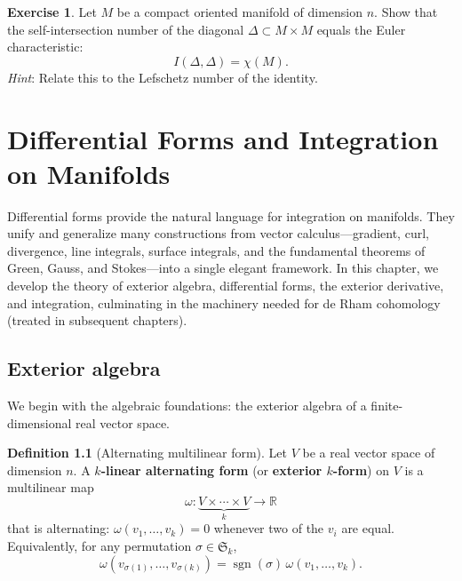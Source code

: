 \documentclass[12pt,a4paper,openany]{book}
\theoremstyle{definition}
\newtheorem{definition}[theorem]{Definition}
\newtheorem{exercise}{Exercise}[chapter]
\theoremstyle{remark}
\newcommand{\R}{\mathbb{R}}
\begin{document}
\begin{exercise}\label{exo:euler-selfintersection-diagonal}
Let $M$ be a compact oriented manifold of dimension $n$. Show that the
self-intersection number of the diagonal $\Delta \subset M \times M$ equals
the Euler characteristic:
\[
  I(\Delta, \Delta) = \chi(M).
\]
\textit{Hint}: Relate this to the Lefschetz number of the identity.
\end{exercise}



\chapter{Differential Forms and Integration on Manifolds}
\label{ch:differential-forms}
\minitoc\vspace{1cm}

Differential forms provide the natural language for integration on manifolds.
They unify and generalize many constructions from vector calculus---gradient,
curl, divergence, line integrals, surface integrals, and the fundamental
theorems of Green, Gauss, and Stokes---into a single elegant framework.
In this chapter, we develop the theory of exterior algebra, differential forms,
the exterior derivative, and integration, culminating in the machinery needed
for de Rham cohomology (treated in subsequent chapters).

\section{Exterior algebra}\label{sec:exterior-algebra}

We begin with the algebraic foundations: the exterior algebra of a
finite-dimensional real vector space.

\begin{definition}[Alternating multilinear form]\label{def:alternating-form}
Let $V$ be a real vector space of dimension $n$. A \textbf{$k$-linear
alternating form} (or \textbf{exterior $k$-form}) on $V$ is a multilinear
map
\[
  \omega \colon \underbrace{V \times \cdots \times V}_{k} \longrightarrow \R
\]
that is alternating: $\omega(v_1, \ldots, v_k) = 0$ whenever two of the
$v_i$ are equal. Equivalently, for any permutation $\sigma \in \mathfrak{S}_k$,
\[
  \omega(v_{\sigma(1)}, \ldots, v_{\sigma(k)})
    = \operatorname{sgn}(\sigma)\, \omega(v_1, \ldots, v_k).
\]
\end{definition}
\end{document}
